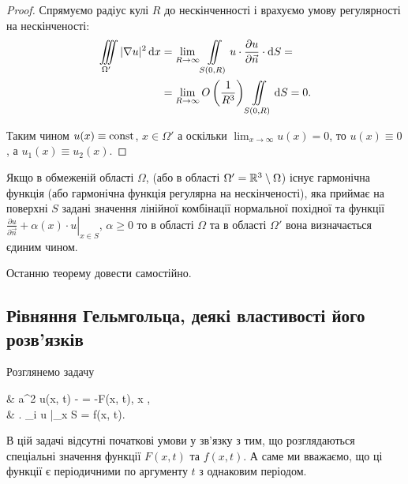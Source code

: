 \begin{proof}
	Спрямуємо радіус кулі $R$ до нескінченності і врахуємо умову регулярності на нескінченості:
	\begin{equation}
		\begin{aligned}
			\displaystyle\iiint\limits_{\Omega'} |\nabla u|^2 \mathop{}\!\mathrm{d} x &= \displaystyle\lim\limits_{R \to \infty} \displaystyle\iint\limits_{S(0, R)} u \cdot \frac{\partial u}{\partial \vec n} \cdot \mathop{}\!\mathrm{d} S = \\
			&= \displaystyle\lim\limits_{R \to \infty} O \left( \frac{1}{R^3} \right) \displaystyle\iint\limits_{S(0, R)} \mathop{}\!\mathrm{d} S = 0.
		\end{aligned}
	\end{equation}

	Таким чином $u(x) \equiv \operatorname{const}$, $x \in \Omega'$ а оскільки $\lim_{x \to \infty} u(x) = 0$, то $u(x) \equiv 0$, а $u_1(x) \equiv u_2(x)$.
\end{proof}

\begin{theorem}
	Якщо в обмеженій області $\Omega$, (або в області $\Omega' = \mathbb{R}^3 \setminus \Omega$) існує гармонічна функція (або гармонічна функція регулярна на нескінченості), яка приймає на поверхні $S$ задані значення лінійної комбінації нормальної похідної та функції $\left. \frac{\partial u}{\partial \vec n} + \alpha(x) \cdot u \right|_{x \in S}$, $\alpha \ge 0$ то в області $\Omega$ та в області $\Omega'$ вона визначається єдиним чином. 
\end{theorem}

\begin{exercise}
	Останню теорему довести самостійно.
\end{exercise}

\subsection{Рівняння Гельмгольца, деякі властивості його \allowbreak роз\-в'яз\-ків}

\begin{example}
	Розглянемо задачу
	\begin{system}
		\label{eq:4.6.1}
		& a^2 \Delta u(x, t) -  = -F(x, t), \quad x \in \Omega, \\
		& \left. \ell_i u \right|_{x \in S} = f(x, t).
	\end{system}
\end{example}

\begin{remark}
	В цій задачі відсутні початкові умови у зв'язку з тим, що розглядаються спеціальні значення функції $F(x, t)$ та $f(x, t)$. А саме ми вважаємо, що ці функції є періодичними по аргументу $t$ з однаковим періодом.
\end{remark}

